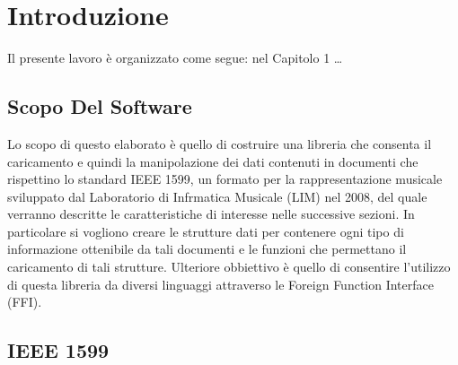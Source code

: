 \documentclass[12pt,italian]{report}
\begin{document}
\frontespizio
\beforepreface

% 
%
        
% 
%


%
%


%
%

\afterpreface

% 
% 

\chapter{Introduzione}
\label{cap1}

Il presente lavoro \`{e} organizzato come segue: nel Capitolo 1 \dots

\section{Scopo Del Software}
\label{sec:scopodelsoftware}
Lo scopo di questo elaborato  \`e quello di costruire una libreria che consenta il caricamento e quindi la manipolazione dei dati contenuti in documenti che rispettino lo standard IEEE 1599, un formato per la rappresentazione musicale sviluppato dal Laboratorio di Infrmatica Musicale (LIM) nel 2008, del quale verranno descritte le caratteristiche di interesse nelle successive sezioni.
In particolare si vogliono creare le strutture dati per contenere ogni tipo di informazione ottenibile da tali documenti e le funzioni che permettano il caricamento di tali strutture.
Ulteriore obbiettivo  \`e quello di consentire l’utilizzo di questa libreria da diversi linguaggi attraverso le Foreign Function Interface (FFI).

\section{IEEE 1599}
\label{sec:ieee1599}
\end{document}
